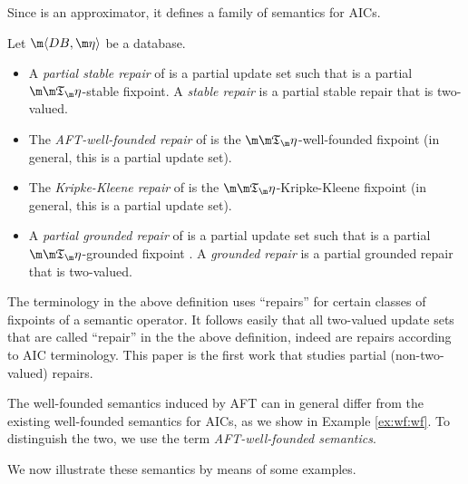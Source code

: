 Since \Ap is an approximator, it defines a family of semantics for AICs. 

\begin{definition}\label{def:semantics}
 Let $\fulldb$ be a database. 
 \begin{itemize}
  \item A \emph{partial stable repair} of \fulldb is a partial update set \UUU such that \UUU is a partial $\Ap$-stable fixpoint. A \emph{stable repair} is a partial stable repair that is two-valued. 
  \item The \emph{AFT-well-founded repair} of \fulldb is the $\Ap$-well-founded fixpoint (in general, this is a partial update set). 
  \item The \emph{Kripke-Kleene repair} of \fulldb is the $\Ap$-Kripke-Kleene fixpoint (in general, this is a partial update set). 
  \item A \emph{partial grounded repair} of \fulldb is a partial update set \UUU such that \UUU is a partial $\Ap$-grounded fixpoint . A \emph{grounded repair} is a partial grounded repair that is two-valued. 
 \end{itemize}
\end{definition}

The terminology in the above definition uses ``repairs'' for certain classes of fixpoints of a semantic operator. It follows easily that  all two-valued update sets that are called ``repair'' in the the above definition, indeed are repairs according to AIC terminology. 
This paper is the first work that studies partial (non-two-valued) repairs. 
 

The well-founded semantics induced by AFT can in general differ from the existing well-founded semantics for AICs, as we show in Example \ref{ex:wf:wf}. To distinguish the two, we use the term \emph{AFT-well-founded semantics}. %

We now illustrate these semantics by means of some examples. 

